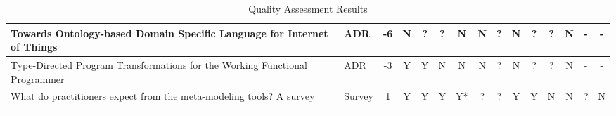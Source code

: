\begin{landscape}
\begin{longtable}{ | p{11cm} | l | *{13}{c|} }
        Towards Ontology-based Domain Specific Language for Internet of Things\cite{negm2020towards_SLR}                                                                       & ADR               &  -6   & N & ? & ? & N & N & ? & N & ? & ? & N  & - & - \\\hline
        Type-Directed Program Transformations for the Working Functional Programmer\cite{lubin2020type_SLR}                                                                    & ADR               &  -3   & Y & Y & N & N & N & ? & N & ? & ? & N  & - & - \\\hline
        What do practitioners expect from the meta-modeling tools? A survey\cite{ozkaya2021practitioners_SLR}                                                                  & Survey            &  1    & Y & Y & Y & Y* & ? & ? & Y & Y & N & N  & ? & N \\\hline
        \caption{Quality Assessment Results}
        \label{table:QA_Results}
    \end{longtable}
\end{landscape}






